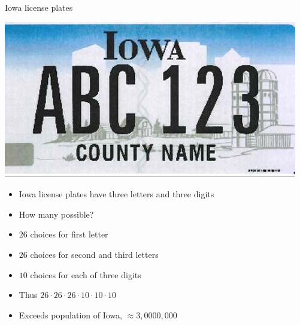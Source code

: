 \documentclass{beamer}
\theoremstyle{definition}
\begin{document}
\begin{frame}{Iowa license plates}
\begin{multicols}{2}
\includegraphics[scale=.3]{LicencePlate}
\begin{itemize}
\item Iowa license plates have three letters
and three digits
\item How many possible?
\item $26$ choices for first letter
\columnbreak
\item $26$ choices for second and third letters
\item $10$ choices for each of three digits
\item Thus $26\cdot 26\cdot 26\cdot 10\cdot 10\cdot 10$
\item Exceeds population of Iowa, $\approx 3,0000,000$
\end{itemize}
\end{multicols}
\end{frame}
\end{document}
